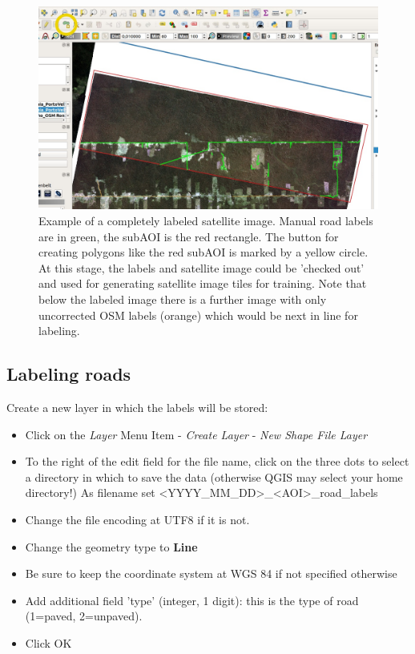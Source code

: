 \documentclass[12pt,a4paper]{scrartcl}
\begin{document}
\begin{figure}[h]
	\centering
	\includegraphics[width=0.9\linewidth]{marking_subAOI01.jpg}
	\caption{Example of a completely labeled satellite image. Manual road labels are in green, the subAOI is the red rectangle. The button for creating polygons like the red subAOI is marked by a yellow circle. At this stage, the labels and satellite image could be 'checked out' and used for generating satellite image tiles for training. Note that below the labeled image there is a further image with only uncorrected OSM labels (orange) which would be next in line for labeling.}
	\label{fig:subaoi}
\end{figure}

\subsection{Labeling roads}
Create a new layer in which the labels will be stored:
\begin{itemize}
	\item Click on the \textit{Layer} Menu Item - \textit{Create Layer} - \textit{New Shape File Layer}
	\item To the right of the edit field for the file name, click on the three dots to select a directory in which to save the data (otherwise QGIS may select your home directory!) As filename set <YYYY\_MM\_DD>\_<AOI>\_road\_labels
	\item Change the file encoding at UTF8 if it is not.
	\item Change the geometry type to \textbf{Line}
	\item Be sure to keep the coordinate system at WGS 84 if not specified otherwise
	\item Add additional field 'type' (integer, 1 digit): this is the type of road (1=paved, 2=unpaved).
	\item Click OK
\end{itemize}
\end{document}
